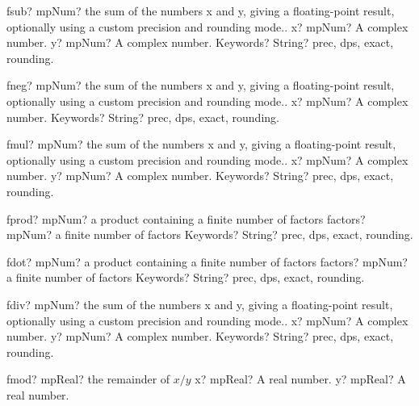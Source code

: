 \documentclass[12pt,a4paper,openany]{book}
\begin{document}
\begin{mpFunctionsExtract}
\mpFunctionThree
{fsub? mpNum? the sum of the numbers x and y, giving a floating-point result, optionally using a custom precision and rounding mode..}
{x? mpNum? A complex number.}
{y? mpNum? A complex number.}
{Keywords? String? prec, dps, exact, rounding.}
\end{mpFunctionsExtract}

\begin{mpFunctionsExtract}
\mpFunctionTwo
{fneg? mpNum? the sum of the numbers x and y, giving a floating-point result, optionally using a custom precision and rounding mode..}
{x? mpNum? A complex number.}
{Keywords? String? prec, dps, exact, rounding.}
\end{mpFunctionsExtract}

\begin{mpFunctionsExtract}
\mpFunctionThree
{fmul? mpNum? the sum of the numbers x and y, giving a floating-point result, optionally using a custom precision and rounding mode..}
{x? mpNum? A complex number.}
{y? mpNum? A complex number.}
{Keywords? String? prec, dps, exact, rounding.}
\end{mpFunctionsExtract}

\begin{mpFunctionsExtract}
\mpFunctionTwo
{fprod? mpNum? a product containing a finite number of factors}
{factors? mpNum? a finite number of factors}
{Keywords? String? prec, dps, exact, rounding.}
\end{mpFunctionsExtract}

\begin{mpFunctionsExtract}
\mpFunctionTwo
{fdot? mpNum? a product containing a finite number of factors}
{factors? mpNum? a finite number of factors}
{Keywords? String? prec, dps, exact, rounding.}
\end{mpFunctionsExtract}

\begin{mpFunctionsExtract}
\mpFunctionThree
{fdiv? mpNum? the sum of the numbers x and y, giving a floating-point result, optionally using a custom precision and rounding mode..}
{x? mpNum? A complex number.}
{y? mpNum? A complex number.}
{Keywords? String? prec, dps, exact, rounding.}
\end{mpFunctionsExtract}

\begin{mpFunctionsExtract}
\mpFunctionTwo
{fmod? mpReal? the remainder of $x/y$}
{x? mpReal? A real number.}
{y? mpReal? A real number.}
\end{mpFunctionsExtract}
\end{document}
